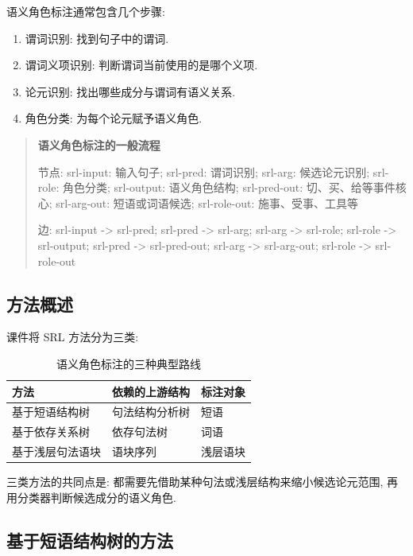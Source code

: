 语义角色标注通常包含几个步骤:

\begin{enumerate}
\item[1.] 谓词识别: 找到句子中的谓词.
\item[2.] 谓词义项识别: 判断谓词当前使用的是哪个义项.
\item[3.] 论元识别: 找出哪些成分与谓词有语义关系.
\item[4.] 角色分类: 为每个论元赋予语义角色.
\end{enumerate}

\begin{quote}
\small
\textbf{语义角色标注的一般流程}
\par 节点: srl-input: 输入句子; srl-pred: 谓词识别; srl-arg: 候选论元识别; srl-role: 角色分类; srl-output: 语义角色结构; srl-pred-out: 切、买、给等事件核心; srl-arg-out: 短语或词语候选; srl-role-out: 施事、受事、工具等
\par 边: srl-input -\textgreater{} srl-pred; srl-pred -\textgreater{} srl-arg; srl-arg -\textgreater{} srl-role; srl-role -\textgreater{} srl-output; srl-pred -\textgreater{} srl-pred-out; srl-arg -\textgreater{} srl-arg-out; srl-role -\textgreater{} srl-role-out
\end{quote}

\subsection{方法概述}


课件将 SRL 方法分为三类:

\begin{table}[H]
\centering
\begingroup
\setlength{\tabcolsep}{2pt}
\small
\caption{语义角色标注的三种典型路线}
\begin{tabular}{|p{}|p{}|p{}|}
\hline
方法 & 依赖的上游结构 & 标注对象 \\ \hline
基于短语结构树 & 句法结构分析树 & 短语 \\ \hline
基于依存关系树 & 依存句法树 & 词语 \\ \hline
基于浅层句法语块 & 语块序列 & 浅层语块 \\ \hline
\end{tabular}
\endgroup
\end{table}

三类方法的共同点是:
都需要先借助某种句法或浅层结构来缩小候选论元范围,
再用分类器判断候选成分的语义角色.

\subsection{基于短语结构树的方法}


